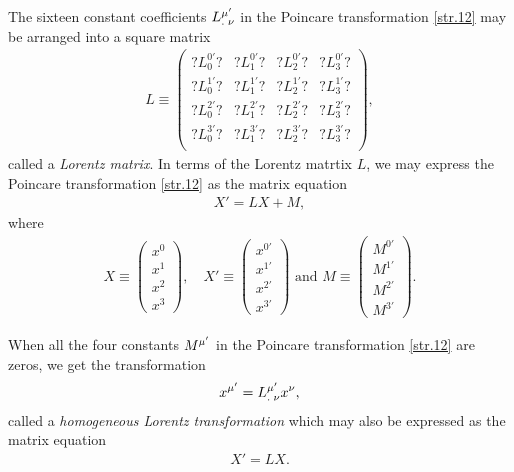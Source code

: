 \begin{small}
 The sixteen constant coefficients 
${{L}^{{\mu'}}_{.\;{\nu}}} $ in the Poincare transformation 
\eqref{str.12} may be arranged into a square matrix
\begin{align}\label{str.13}
L \equiv\begin{pmatrix}
?L^{0'}_0?& ?L^{0'}_1?& ?L^{0'}_2? & ?L^{0'}_3?\\
?L^{1'}_0?& ?L^{1'}_1?& ?L^{1'}_2? & ?L^{1'}_3?\\
?L^{2'}_0?& ?L^{2'}_1?& ?L^{2'}_2? & ?L^{2'}_3?\\
?L^{3'}_0?& ?L^{3'}_1?& ?L^{3'}_2? & ?L^{3'}_3?\\
\end{pmatrix} ,
\end{align}
called a \textsl{Lorentz matrix}. In terms of the Lorentz 
matrtix $L$, we may express the Poincare transformation 
\eqref{str.12} as the matrix equation 
\begin{align}\label{str.14}
 X'=LX +M,
\end{align}
where 
\begin{align}\label{str.15}
X\equiv\begin{pmatrix}x^0\\x^1\\x^2\\x^3\end{pmatrix},
\quad 
X'\equiv\begin{pmatrix}x^{0'}\\x^{1'}\\x^{2'}\\x^{3'}   
\end{pmatrix} \text{ and }
M\equiv\begin{pmatrix}M^{0'}\\M^{1'}\\M^{2'}\\M^{3'}    
\end{pmatrix}.
\end{align}

 When all the four  
constants $M^{{\mu'}}$ in the Poincare  transformation 
\eqref{str.12} are zeros, we get the transformation
\begin{align}\label{str.16}
x^{{\mu'}} ={{L}^{{\mu'}}_{.\;{\nu}}}x^{{\nu}},
\end{align} 
called a \textsl{homogeneous Lorentz transformation} which 
may also be expressed as the matrix equation
\begin{align}\label{str.17}
X'=LX.
\end{align}  


\end{small}
